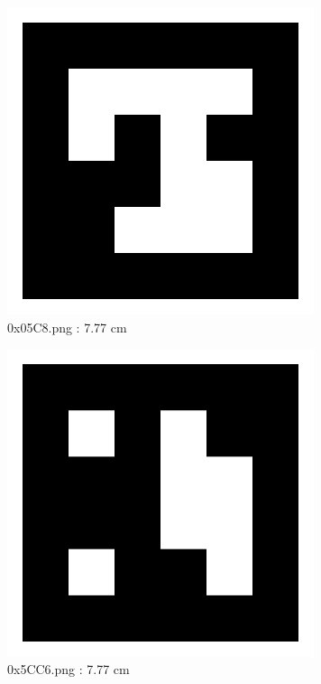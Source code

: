 \documentclass[11pt,a4,BCOR=0cm]{scrartcl}
\begin{document}
\begin{figure}
  \centering
    \includegraphics[natwidth=400,natheight=400,width=9cm]{0x05C8.png}
    \caption{0x05C8.png : 7.77 cm}
    \label{fig:0x05C8.png}
  
\end{figure} 

\begin{figure}
  \centering
    \includegraphics[natwidth=400,natheight=400,width=9cm]{0x5CC6.png}
    \caption{0x5CC6.png : 7.77 cm}
    \label{fig:0x5CC6.png}
  
\end{figure} 

\clearpage
\end{document}
